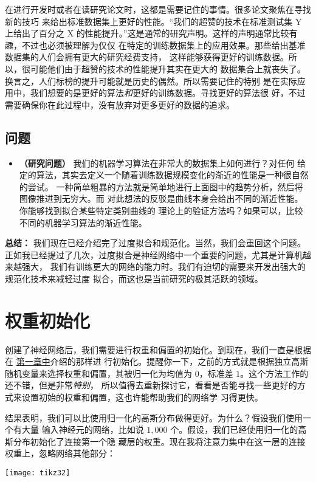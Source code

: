 在进行开发时或者在读研究论文时，这都是需要记住的事情。很多论文聚焦在寻找新的技巧
来给出标准数据集上更好的性能。“我们的超赞的技术在标准测试集 Y 上给出了百分之 X
的性能提升。”这是通常的研究声明。这样的声明通常比较有趣，不过也必须被理解为仅仅
在特定的训练数据集上的应用效果。那些给出基准数据集的人们会拥有更大的研究经费支持，
这样能够获得更好的训练数据。所以，很可能他们由于超赞的技术的性能提升其实在更大的
数据集合上就丧失了。换言之，人们标榜的提升可能就是历史的偶然。所以需要记住的特别
是在实际应用中，我们想要的是更好的算法\emph{和}更好的训练数据。寻找更好的算法很
好，不过需要确保你在此过程中，没有放弃对更多更好的数据的追求。

\subsection*{问题}

\begin{itemize}
\item \textbf{（研究问题）} 我们的机器学习算法在非常大的数据集上如何进行？对任何
  给定的算法，其实去定义一个随着训练数据规模变化的渐近的性能是一种很自然的尝试。
  一种简单粗暴的方法就是简单地进行上面图中的趋势分析，然后将图像推进到无穷大。而
  对此想法的反驳是曲线本身会给出不同的渐近性能。你能够找到拟合某些特定类别曲线的
  理论上的验证方法吗？如果可以，比较不同的机器学习算法的渐近性能。
\end{itemize}

\textbf{总结：} 我们现在已经介绍完了过度拟合和规范化。当然，我们会重回这个问题。
正如我已经提过了几次，过度拟合是神经网络中一个重要的问题，尤其是计算机越来越强大，
我们有训练更大的网络的能力时。我们有迫切的需要来开发出强大的规范化技术来减轻过度
拟合，而这也是当前研究的极其活跃的领域。

\section{权重初始化}
\label{sec:weight_initialization}

创建了神经网络后，我们需要进行权重和偏置的初始化。到现在，我们一直是根据在%
\hyperref[ch:UsingNeuralNetsToRecognizeHandwrittenDigits]{第一章中}介绍的那样进
行初始化。提醒你一下，之前的方式就是根据独立高斯随机变量来选择权重和偏置，其被归一化为均值为 $0$，标准差 $1$。这个方法工作的还不错，但是非常\emph{特别}，
所以值得去重新探讨它，看看是否能寻找一些更好的方式来设置初始的权重和偏置，这也许能帮助我们的网络学
习得更快。

结果表明，我们可以比使用归一化的高斯分布做得更好。为什么？假设我们使用一个有大量
输入神经元的网络，比如说 $1,000$ 个。假设，我们已经使用归一化的高斯分布初始化了连接第一个隐
藏层的权重。现在我将注意力集中在这一层的连接权重上，忽略网络其他部分：
\begin{center}
  \texttt{[image: tikz32]}
\end{center}

